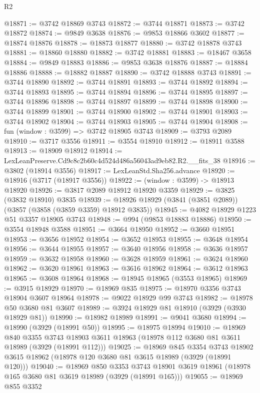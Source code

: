 \begin{lexlean}{R2}
\begin{coremodule}
@18871 := @3742 @18869 @3743
@18872 := @3744 @18871
@18873 := @3742 @18872
@18874 := @9849 @3638
@18876 := @9853 @18866 @3602
@18877 := @18874 @18876
@18878 := @18873 @18877
@18880 := @3742 @18878 @3743
@18881 := @18860 @18880
@18882 := @3742 @18881
@18883 := @18467 @3658
@18884 := @9849 @18883
@18886 := @9853 @3638 @18876
@18887 := @18884 @18886
@18888 := @18882 @18887
@18890 := @3742 @18888 @3743
@18891 := @3744 @18890
@18892 := @3744 @18891
@18893 := @3744 @18892
@18894 := @3744 @18893
@18895 := @3744 @18894
@18896 := @3744 @18895
@18897 := @3744 @18896
@18898 := @3744 @18897
@18899 := @3744 @18898
@18900 := @3744 @18899
@18901 := @3744 @18900
@18902 := @3744 @18901
@18903 := @3744 @18902
@18904 := @3744 @18903
@18905 := @3744 @18904
@18908 := fun (window : @3599) => @3742 @18905 @3743
@18909 := @3793 @2089
@18910 := @3717 @3556
@18911 := @3554 @18910
@18912 := @18911 @3588
@18913 := @18909 @18912
@18914 := LexLeanPreserve.Cd9c8c2b60c4d524d486a56043ad9eb82.R2.__fits_38
@18916 := @3802 (@18914 @3556)
@18917 := LexLeanStd.Sha256.advance
@18920 := @18916 (@3717 (@18917 @3556))
@18922 := (window : @3599) -> @18913 @18920
@18926 := @3817 @2089 @18912 @18920 @3359
@18929 := @3825 (@3832 @18910) @3835
@18939 := @18926 @18929 (@3841 (@3851 @2089)) (@3857 (@3858 (@3859 @3359) @18912 @3835))
@18945 := @4082 @18929 @1223 @51 @3357 @18905 @3743
@18948 := @994 (@9853 @18883 @18886)
@18950 := @3554 @18948 @3588
@18951 := @3664 @18950
@18952 := @3660 @18951
@18953 := @3656 @18952
@18954 := @3652 @18953
@18955 := @3648 @18954
@18956 := @3644 @18955
@18957 := @3640 @18956
@18958 := @3636 @18957
@18959 := @3632 @18958
@18960 := @3628 @18959
@18961 := @3624 @18960
@18962 := @3620 @18961
@18963 := @3616 @18962
@18964 := @3612 @18963
@18965 := @3608 @18964
@18968 := @18945 @18965 (@3553 @18965)
@18969 := @3915 @18929
@18970 := @18969 @835
@18975 := @18970 @3356 @3743 @18904 @3607 @18964
@18978 := @9022 @18929 @99 @3743
@18982 := @18978 @50 @3680 @81 @3607
@18989 := @3924 @18929 @81 @18910 (@3929 (@3930 @18929 @81))
@18990 := @18982 @18989
@18991 := @9041 @3680
@18994 := @18990 (@3929 (@18991 @50))
@18995 := @18975 @18994
@19010 := @18969
    @840
    @3355
    @3743
    @18903
    @3611
    @18963
    (@18978 @112 @3680 @81 @3611 @18989 (@3929 (@18991 @112)))
@19025 := @18969
    @845
    @3354
    @3743
    @18902
    @3615
    @18962
    (@18978 @120 @3680 @81 @3615 @18989 (@3929 (@18991 @120)))
@19040 := @18969
    @850
    @3353
    @3743
    @18901
    @3619
    @18961
    (@18978 @165 @3680 @81 @3619 @18989 (@3929 (@18991 @165)))
@19055 := @18969
    @855
    @3352

\end{coremodule}
\end{lexlean}
